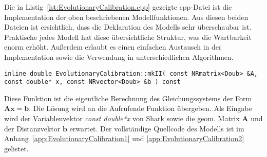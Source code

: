 %
%

%
Die in Listig~\ref{lst:EvolutionaryCalibration.cpp} gezeigte cpp-Datei ist die Implementation der oben beschriebenen Modellfunktionen. Aus diesen beiden Dateien ist ersichtlich, dass die Deklaration des Modells sehr überschaubar ist. Praktische jedes Modell hat diese übersichtliche Struktur, was die Wartbarkeit enorm erhöht. Außerdem erlaubt es einen einfachen Austausch in der Implementation sowie die Verwendung in unterschiedlichen Algorithmen. 
%
\begin{lstlisting}[label=EvolutionaryCalibration_4]
inline double EvolutionaryCalibration::mkII( const NRmatrix<Doub> &A, const double* x, const NRvector<Doub> &b ) const
\end{lstlisting}
%
Diese Funktion ist die eigentliche Berechnung des Gleichungssystems der Form $\mathbf{A}\mathbf{x}=\textbf{b}$. Die Lösung wird an die Aufrufende Funktion übergeben. Als Eingabe wird der Variablenvektor \textit{const double*x} von Shark sowie die geom. Matrix $\mathbf{A}$ und der Distanzvektor $\mathbf{b}$ erwartet.
%
Der vollständige Quellcode des Modells ist im Anhang~\ref{app:EvolutionaryCalibration1} und \ref{app:EvolutionaryCalibration2} gelistet.
%
%

%
%
